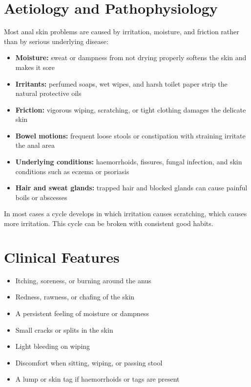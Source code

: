 \section*{Aetiology and Pathophysiology}
Most anal skin problems are caused by irritation, moisture, and friction rather than by serious underlying disease:
\begin{itemize}
    \item \textbf{Moisture:} sweat or dampness from not drying properly softens the skin and makes it sore
    \item \textbf{Irritants:} perfumed soaps, wet wipes, and harsh toilet paper strip the natural protective oils
    \item \textbf{Friction:} vigorous wiping, scratching, or tight clothing damages the delicate skin
    \item \textbf{Bowel motions:} frequent loose stools or constipation with straining irritate the anal area
    \item \textbf{Underlying conditions:} haemorrhoids, fissures, fungal infection, and skin conditions such as eczema or psoriasis
    \item \textbf{Hair and sweat glands:} trapped hair and blocked glands can cause painful boils or abscesses
\end{itemize}
In most cases a cycle develops in which irritation causes scratching, which causes more irritation. This cycle can be broken with consistent good habits.

\section*{Clinical Features}
\begin{itemize}
    \item Itching, soreness, or burning around the anus
    \item Redness, rawness, or chafing of the skin
    \item A persistent feeling of moisture or dampness
    \item Small cracks or splits in the skin
    \item Light bleeding on wiping
    \item Discomfort when sitting, wiping, or passing stool
    \item A lump or skin tag if haemorrhoids or tags are present
\end{itemize}

